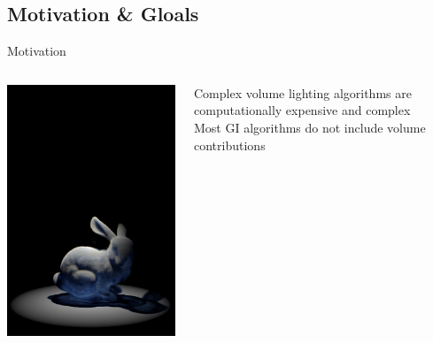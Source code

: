 \documentclass[10pt,compress,professionalfont]{beamer}
\begin{document}
\subsection{Motivation & Gloals}
\begin{frame}{Motivation}

    \begin{columns}
        \begin{column}{0.35\textwidth}
            {\centering \includegraphics[width=\textwidth]{../img/bunny_spot_sad}\\}

        \end{column}
        \begin{column}{0.65\textwidth}
            Complex volume lighting algorithms are computationally expensive and complex\\
            \vspace{8mm}
            Most GI algorithms do not include volume contributions\\
            
        \end{column}
    \end{columns}
\end{frame}
\end{document}
